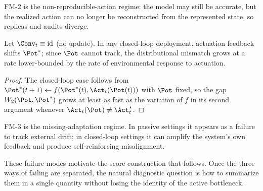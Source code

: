 \begin{remark}[Interpretation]
FM-2 is the non-reproducible-action regime: the model may still be accurate,
but the realized action can no longer be reconstructed from the represented
state, so replicas and audits diverge.
\end{remark}

\begin{proposition}\label{prop:failPhi}
Let $\Conv_t\equiv\mathrm{id}$ (no update). In any closed-loop deployment,
actuation feedback shifts $\Pot^*$; since $\Pot$ cannot track, the
distributional mismatch grows at a rate lower-bounded by the rate of
environmental response to actuation.
\end{proposition}

\begin{proof}
The closed-loop case follows from
$\Pot^*(t+1)\leftarrow f(\Pot^*(t), \Act_t(\Pot(t)))$ with $\Pot$ fixed, so
the gap $W_2(\Pot,\Pot^*)$ grows at least as fast as the variation of $f$ in
its second argument whenever $\Act_t(\Pot)\neq\Act^*_t$.
\end{proof}

\begin{remark}[Interpretation]
FM-3 is the missing-adaptation regime. In passive settings it appears as a
failure to track external drift; in closed-loop settings it can amplify the
system's own feedback and produce self-reinforcing misalignment.
\end{remark}

These failure modes motivate the score construction that follows. Once the three
ways of failing are separated, the natural diagnostic question is how to
summarize them in a single quantity without losing the identity of the active
bottleneck.
